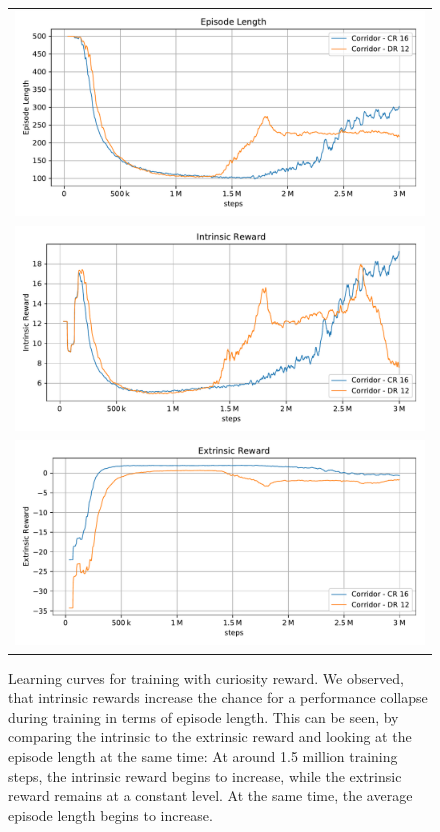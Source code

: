 \begin{figure}[htp]
    
    \begin{center}
        \begin{tabular}{c}
            \includegraphics[clip, width=0.75\columnwidth]{figures/evaluation/rewards/curiosity_divergence_ep_len.pdf} \\
            \includegraphics[clip, width=0.75\columnwidth]{figures/evaluation/rewards/curiosity_divergence_int_rew.pdf} \\
            \includegraphics[clip, width=0.75\columnwidth]{figures/evaluation/rewards/curiosity_divergence_ext_rew.pdf}
        \end{tabular}

    \end{center}
    
    \caption[Problems with Curiosity Reward]{Learning curves for training with curiosity reward. We observed, that intrinsic rewards increase the chance for a performance collapse during training in terms of episode length. This can be seen, by comparing the intrinsic to the extrinsic reward and looking at the episode length at the same time: At around 1.5 million training steps, the intrinsic reward begins to increase, while the extrinsic reward remains at a constant level. At the same time, the average episode length begins to increase.}
    \label{fig:CuriosityDiverge}
\end{figure}


